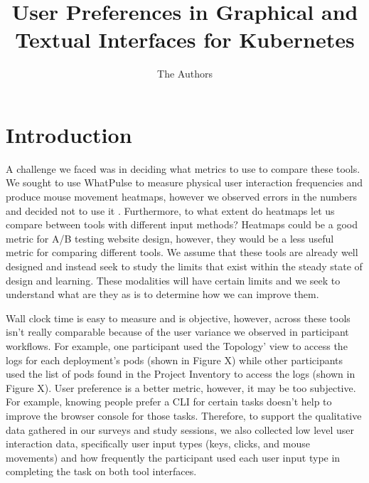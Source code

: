 \documentclass[11pt, oneside]{article}   	%
\title{User Preferences in Graphical and Textual Interfaces for Kubernetes}
\author{The Authors}
\begin{document}
\maketitle

\section{Introduction}


A challenge we faced was in deciding what metrics to use to compare these tools. We sought to use WhatPulse to measure physical user interaction frequencies and produce mouse movement heatmaps, however we observed errors in the numbers and decided not to use it \cite{}. Furthermore, to what extent do heatmaps let us compare between tools with different input methods? Heatmaps could be a good metric for A/B testing website design, however, they would be a less useful metric for comparing different tools. We assume that these tools are already well designed and instead seek to study the limits that exist within the steady state of design and learning. These modalities will have certain limits and we seek to understand what are they as is to determine how we can improve them. 

Wall clock time is easy to measure and is objective, however, across these tools isn’t really comparable because of the user variance we observed in participant workflows. For example, one participant used the Topology' view to access the logs for each deployment's pods (shown in Figure X) while other participants used the list of pods found in the Project Inventory to access the logs (shown in Figure X). User preference is a better metric, however, it may be too subjective. For example, knowing people prefer a CLI for certain tasks doesn’t help to improve the browser console for those tasks. Therefore, to support the qualitative data gathered in our surveys and study sessions, we also collected low level user interaction data, specifically user input types (keys, clicks, and mouse movements) and how frequently the participant used each user input type in completing the task on both tool interfaces. 
\end{document}
